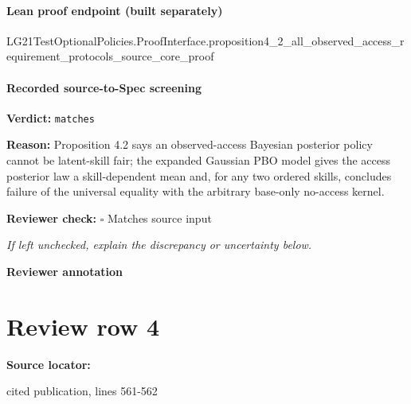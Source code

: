 \documentclass[10pt]{article}
\newcommand{\reviewerbox}{%
  \par\noindent\fbox{\parbox{0.96\linewidth}{\rule{0pt}{0.38in}}}\par
}
\newcommand{\reviewmatch}[1]{%
  \par\noindent\textbf{Reviewer check:} $\square$\; #1\par
  \noindent\emph{If left unchecked, explain the discrepancy or uncertainty below.}\par
}
\begin{document}
\paragraph{Lean proof endpoint (built separately)}\begin{ReviewVerbatim}
LG21TestOptionalPolicies.ProofInterface.proposition4_2_all_observed_access_requirement_protocols_source_core_proof
\end{ReviewVerbatim}

\paragraph{Recorded source-to-Spec screening}
\textbf{Verdict:} \texttt{matches}
\\
{\raggedright
\textbf{Reason:} Proposition 4.\allowbreak{}2 says an observed-\allowbreak{}access Bayesian posterior policy cannot be latent-\allowbreak{}skill fair;\allowbreak{} the expanded Gaussian PBO model gives the access posterior law a skill-\allowbreak{}dependent mean and, for any two ordered skills, concludes failure of the universal equality with the arbitrary base-\allowbreak{}only no-\allowbreak{}access kernel.\allowbreak{}
\par}
\reviewmatch{Matches source input}
\noindent\textbf{Reviewer annotation}\par
\reviewerbox
\clearpage
\hypertarget{source-claim-180279c7d9836b3a}{}
\section*{Review row 4}
\textbf{Source locator:} {\footnotesize\raggedright cited publication, lines 561-\allowbreak{}562\par}
\end{document}
